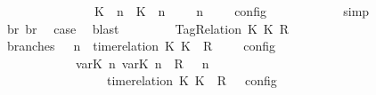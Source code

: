 \begin{isabellebody}
\ \ \ \ \ \ \ \ \ \ \ \ \ {\isasymunion}\ {\isasymlbrakk}\ {\isacharparenleft}{\isacharparenleft}K\ {\isasymUp}\ n{\isacharparenright}\ {\isacharhash}\ {\isacharparenleft}K\ {\isasymDown}\ n\ {\isacharat}\ {\isasymtau}{\isacharparenright}\ {\isacharhash}\ {\isasymGamma}{\isacharparenright}{\isacharcomma}\ n\ {\isasymturnstile}\ {\isasymPsi}\ {\isasymtriangleright}\ {\isasymPhi}\ {\isasymrbrakk}\isactrlsub c\isactrlsub o\isactrlsub n\isactrlsub f\isactrlsub i\isactrlsub g{\isacartoucheclose}\isanewline
\ \ \ \ \ \ \ \ \ \ \isamarkupfalse%
\ simp\isanewline
\ \ \ \ \ \ \ \ \isamarkupfalse%
\ br{}\ br{}\ \isamarkupfalse%
\ {\isacharquery}case\ \isamarkupfalse%
\ blast\isanewline
\ \ \isamarkupfalse%
\isanewline
\ \ \ \ \isamarkupfalse%
\ {\isacharparenleft}TagRelation\ K\ K\ R{\isacharparenright}\isanewline
\ \ \ \ \ \ \isamarkupfalse%
\ branches{\isacharcolon}\ {\isacartoucheopen}{\isasymlbrakk}\ {\isasymGamma}{\isacharcomma}\ n\ {\isasymturnstile}\ {\isacharparenleft}{\isacharparenleft}time{\isacharminus}relation\ {\isasymlfloor}K\ K\ {\isasymin}\ R{\isacharparenright}\ {\isacharhash}\ {\isasymPsi}{\isacharparenright}\ {\isasymtriangleright}\ {\isasymPhi}\ {\isasymrbrakk}\isactrlsub c\isactrlsub o\isactrlsub n\isactrlsub f\isactrlsub i\isactrlsub g\isanewline
\ \ \ \ \ \ \ \ \ \ {\isacharequal}\ {\isasymlbrakk}\ {\isacharparenleft}{\isacharparenleft}{\isasymlfloor}{\isasymtau}\isactrlsub v\isactrlsub a\isactrlsub r{\isacharparenleft}K\ n{\isacharparenright}{\isacharcomma}\ {\isasymtau}\isactrlsub v\isactrlsub a\isactrlsub r{\isacharparenleft}K\ n{\isacharparenright}{\isasymrfloor}\ {\isasymin}\ R{\isacharparenright}\ {\isacharhash}\ {\isasymGamma}{\isacharparenright}{\isacharcomma}\ n\isanewline
\ \ \ \ \ \ \ \ \ \ \ \ \ \ {\isasymturnstile}\ {\isasymPsi}\ {\isasymtriangleright}\ {\isacharparenleft}{\isacharparenleft}time{\isacharminus}relation\ {\isasymlfloor}K\ K\ {\isasymin}\ R{\isacharparenright}\ {\isacharhash}\ {\isasymPhi}{\isacharparenright}\ {\isasymrbrakk}\isactrlsub c\isactrlsub o\isactrlsub n\isactrlsub f\isactrlsub i\isactrlsub g{\isacartoucheclose}\isanewline
\ \ \ \ \ \ \ \ \isamarkupfalse%

\end{isabellebody}
